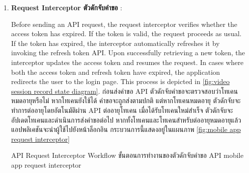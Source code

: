\begin{enumerate}
    \item \textbf{\ifenglish Request Interceptor \else ตัวดักจับคำขอ \fi}: 

    \ifenglish
    Before sending an API request, the request interceptor verifies whether the access token has expired. If the token is valid, the request proceeds as usual. If the token has expired, the interceptor automatically refreshes it by invoking the refresh token API. Upon successfully retrieving a new token, the interceptor updates the access token and resumes the request. In cases where both the access token and refresh token have expired, the application redirects the user to the login page. This process is depicted in \ref{fig:video session record state diagram}.
    \else
    ก่อนส่งคำขอ API ตัวดักจับคำขอจะตรวจสอบว่าโทเคนหมดอายุหรือไม่ หากโทเคนยังใช้ได้ คำขอจะถูกส่งตามปกติ แต่หากโทเคนหมดอายุ ตัวดักจับจะทำการต่ออายุโดยอัตโนมัติผ่าน API ต่ออายุโทเคน เมื่อได้รับโทเคนใหม่สำเร็จ ตัวดักจับจะอัปเดตโทเคนและดำเนินการส่งคำขอต่อไป หากทั้งโทเคนและโทเคนสำหรับต่ออายุหมดอายุแล้ว แอปพลิเคชันจะนำผู้ใช้ไปยังหน้าล็อกอิน กระบวนการนี้แสดงอยู่ในแผนภาพ \ref{fig:mobile app request interceptor}
    \fi

    {\ifenglish API Request Interceptor Workflow \else ขั้นตอนการทำงานของตัวดักจับคำขอ API \fi}
    {mobile app request interceptor}



\end{enumerate}